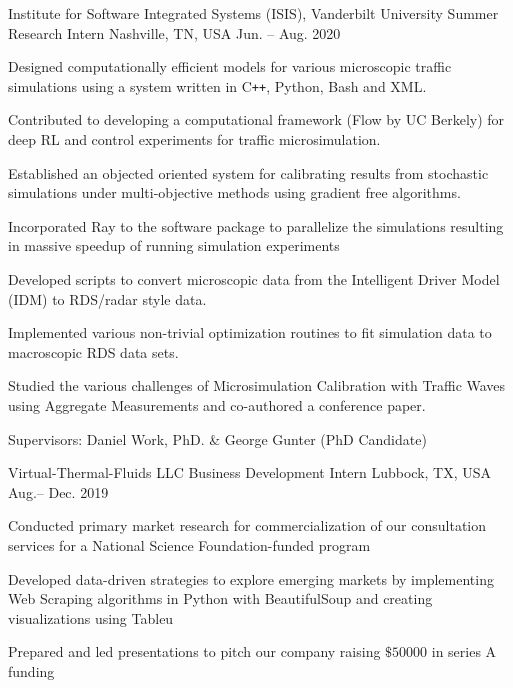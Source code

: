 
\begin{cventries}

    \cventry
    {Institute for Software Integrated Systems (ISIS), Vanderbilt University}
    {Summer Research Intern}
    {Nashville, TN, USA}
    {Jun. -- Aug. 2020}
    {
        \begin{cvitems}
        \item{Designed computationally efficient models for various microscopic traffic simulations using a system written in C\texttt{++}, Python, Bash and XML.}
        \item{Contributed to developing a computational framework (Flow by UC Berkely) for deep RL and control experiments for traffic microsimulation.}
        \item{Established an objected oriented system for calibrating results from stochastic simulations under multi-objective methods using gradient free algorithms.}
        \item{Incorporated Ray to the software package to parallelize the simulations resulting in massive speedup of running simulation experiments}
        \item{Developed scripts to convert microscopic data from the Intelligent Driver Model (IDM) to RDS/radar style data.}
        \item{Implemented various non-trivial optimization routines to fit simulation data to macroscopic RDS data sets.}
        \item{Studied the various challenges of Microsimulation Calibration with Traffic Waves using Aggregate Measurements and co-authored a conference paper.}
        \item{Supervisors: Daniel Work, PhD. \& George Gunter (PhD Candidate) }
        \end{cvitems}
    }

    \cventry
    {Virtual-Thermal-Fluids LLC}
    {Business Development Intern}
    {Lubbock, TX, USA}
    {Aug.-- Dec. 2019}
    {
        \begin{cvitems}
        \item{Conducted primary market research for commercialization of our consultation services for a National Science Foundation-funded program}
        \item{Developed data-driven strategies to explore emerging markets by implementing Web Scraping algorithms in Python with BeautifulSoup and creating visualizations using Tableu}
        \item{Prepared and led presentations to pitch our company raising $\$50000$ in series A funding}
        \end{cvitems}
    }

\end{cventries}
